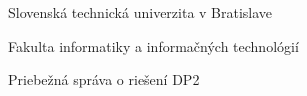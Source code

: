 \begin{center}
\thispagestyle{empty}
{\Large Slovenská technická univerzita v Bratislave}
\par\end{center}{\Large \par}

\begin{center}
{\Large Fakulta informatiky a informačných technológií}
\par\end{center}{\Large \par}

\smallskip{}

\begin{center}
\myEvidenceNumber
\par\end{center}
\vfill{}

\begin{center}
\textbf{\Large \myName}
\par\end{center}{\Large \par}

\medskip{}


\begin{center}
\textbf{\LARGE \myTitle }
\par\end{center}{\huge \par}

\medskip{}


\begin{center}

{\Large Priebežná správa o riešení DP2}
\par\end{center}{\Large \par}

\vfill{}